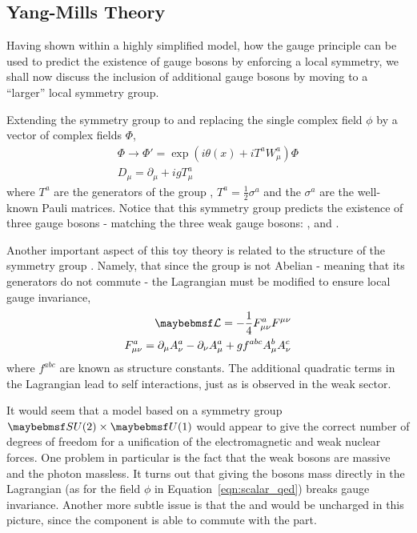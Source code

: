 \subsection{Yang-Mills Theory}
Having shown within a highly simplified model, how the gauge principle can be
used to predict the existence of gauge bosons by enforcing a local symmetry, we
shall now discuss the inclusion of additional gauge bosons by moving to a
``larger'' local symmetry group.

Extending the symmetry group to \SUtwo and replacing the single complex field
$\phi$ by a vector of complex fields $\Phi$,
\begin{eqnarray*}
\Phi \longrightarrow \Phi' = \exp\left(i\theta(x) + iT^a W^a_{\mu}\right)\Phi\\
D_{\mu} = \partial_{\mu} + igT^a_{\mu}
\end{eqnarray*}
where $T^a$ are the generators of the group \SUtwo, $T^a = \frac{1}{2}\sigma^a$
and the $\sigma^a$ are the well-known Pauli matrices. Notice that this symmetry
group predicts the existence of three gauge bosons - matching the three weak
gauge bosons: \PZ, \PWp and \PWm.

Another important aspect of this toy theory is related to the structure of the
symmetry group \SUtwo. Namely, that since the group is not Abelian - meaning
that its generators do not commute - the Lagrangian must be modified to ensure
local gauge invariance,
\begin{eqnarray*}
\lagrangiand = -\frac{1}{4}F^a_{\mu\nu}F^{\mu\nu} \\
F^a_{\mu\nu} = \partial_{\mu} A^a_{\nu} - \partial_{\nu} A^a_{\mu} + g f^{abc}
A^b_{\mu} A^c_{\nu}
\end{eqnarray*}
where $f^{abc}$ are known as structure constants. The additional quadratic terms
in the Lagrangian lead to self interactions, just as is observed in the weak
sector.

It would seem that a model based on a symmetry group $\SUtwo\times\Uone$ would
appear to give the correct number of degrees of freedom for a unification of the
electromagnetic and weak nuclear forces. One problem in particular is the fact
that the weak bosons are massive and the photon massless. It turns out that
giving the bosons mass directly in the Lagrangian (as for the field $\phi$ in
Equation~\ref{eqn:scalar_qed}) breaks gauge invariance. Another more subtle
issue is that the \PWp and \PWm would be uncharged in this picture, since the
\SUtwo component is able to commute with the \Uone part.

